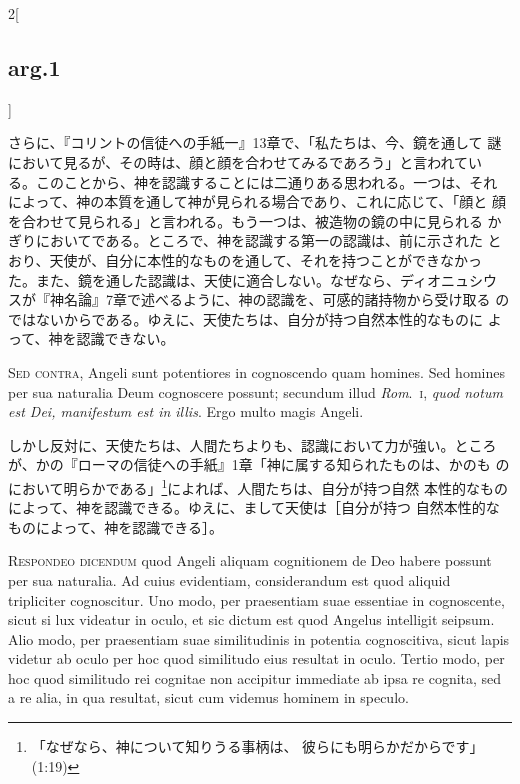 \documentclass[paper=a4paper,fontsize=10pt,jafontsize=9pt,titlepage]{jlreq}
\begin{document}
\begin{paracol}{2}[\subsection{arg.1}]
\switchcolumn

さらに、『コリントの信徒への手紙一』13章で、「私たちは、今、鏡を通して
謎において見るが、その時は、顔と顔を合わせてみるであろう」と言われてい
る。このことから、神を認識することには二通りある思われる。一つは、それ
によって、神の本質を通して神が見られる場合であり、これに応じて、「顔と
顔を合わせて見られる」と言われる。もう一つは、被造物の鏡の中に見られる
かぎりにおいてである。ところで、神を認識する第一の認識は、前に示された
とおり、天使が、自分に本性的なものを通して、それを持つことができなかっ
た。また、鏡を通した認識は、天使に適合しない。なぜなら、ディオニュシウ
スが『神名論』7章で述べるように、神の認識を、可感的諸持物から受け取る
のではないからである。ゆえに、天使たちは、自分が持つ自然本性的なものに
よって、神を認識できない。

\switchcolumn*[\subsection{s.c.}]

{\scshape Sed contra}, Angeli sunt potentiores in cognoscendo quam
homines. Sed homines per sua naturalia Deum cognoscere possunt;
secundum illud {\itshape Rom}.~{\scshape i}, {\itshape quod notum est
Dei, manifestum est in illis}. Ergo multo magis Angeli.

\switchcolumn

しかし反対に、天使たちは、人間たちよりも、認識において力が強い。ところ
が、かの『ローマの信徒への手紙』1章「神に属する知られたものは、かのも
のにおいて明らかである」\footnote{「なぜなら、神について知りうる事柄は、
彼らにも明らかだからです」(1:19)}によれば、人間たちは、自分が持つ自然
本性的なものによって、神を認識できる。ゆえに、まして天使は［自分が持つ
自然本性的なものによって、神を認識できる］。


{\scshape Respondeo dicendum} quod Angeli aliquam cognitionem de Deo
habere possunt per sua naturalia. Ad cuius evidentiam, considerandum
est quod aliquid tripliciter cognoscitur. Uno modo, per praesentiam
suae essentiae in cognoscente, sicut si lux videatur in oculo, et sic
dictum est quod Angelus intelligit seipsum. Alio modo, per praesentiam
suae similitudinis in potentia cognoscitiva, sicut lapis videtur ab
oculo per hoc quod similitudo eius resultat in oculo. Tertio modo, per
hoc quod similitudo rei cognitae non accipitur immediate ab ipsa re
cognita, sed a re alia, in qua resultat, sicut cum videmus hominem in
speculo.


\end{paracol}
\end{document}
